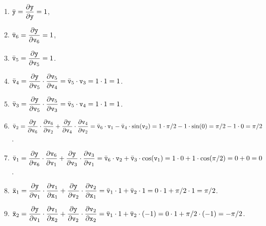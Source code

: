 \begin{enumerate}
\item $\displaystyle \bar{\mathtt{y}} = \frac{\partial \mathtt{y}}{\partial \mathtt{y}} = 1$,
\item $\displaystyle \bar{\mathtt{v}}_6 = \frac{\partial \mathtt{y}}{\partial \mathtt{v}_6} = 1$,
\item $\displaystyle \bar{\mathtt{v}}_5 = \frac{\partial \mathtt{y}}{\partial \mathtt{v}_5} = 1$.
\item $\displaystyle \bar{\mathtt{v}}_4 =
       \frac{\partial \mathtt{y}}{\partial \mathtt{v}_5} \cdot  \frac{\partial \mathtt{v}_5}{\partial \mathtt{v}_4}
       = \bar{\mathtt{v}}_5 \cdot \mathtt{v}_3 = 1 \cdot 1 = 1$.
\item $\displaystyle \bar{\mathtt{v}}_3 =
       \frac{\partial \mathtt{y}}{\partial \mathtt{v}_5} \cdot  \frac{\partial \mathtt{v}_5}{\partial \mathtt{v}_3}
       = \bar{\mathtt{v}}_5 \cdot \mathtt{v}_4 = 1 \cdot 1 = 1$.
\item $\displaystyle \bar{\mathtt{v}}_2 =
       \frac{\partial \mathtt{y}}{\partial \mathtt{v}_6} \cdot  \frac{\partial \mathtt{v}_6}{\partial \mathtt{v}_2} +
       \frac{\partial \mathtt{y}}{\partial \mathtt{v}_4} \cdot  \frac{\partial \mathtt{v}_4}{\partial \mathtt{v}_2} 
       = \bar{\mathtt{v}}_6 \cdot \mathtt{v}_1 - \bar{\mathtt{v}}_4 \cdot \sin(\mathtt{v}_2)
          = 1 \cdot \pi/2 - 1 \cdot \sin(0) = \pi/2 - 1 \cdot 0 = \pi/2$.
\item $\displaystyle \bar{\mathtt{v}}_1 =
       \frac{\partial \mathtt{y}}{\partial \mathtt{v}_6} \cdot  \frac{\partial \mathtt{v}_6}{\partial \mathtt{v}_1} +
       \frac{\partial \mathtt{y}}{\partial \mathtt{v}_3} \cdot  \frac{\partial \mathtt{v}_3}{\partial \mathtt{v}_1} 
       = \bar{\mathtt{v}}_6 \cdot \mathtt{v}_2 + \bar{\mathtt{v}}_3 \cdot \cos(\mathtt{v}_1)
          = 1 \cdot 0 + 1 \cdot \cos(\pi/2) = 0 + 0 = 0$.
\item $\displaystyle \bar{\mathtt{x}}_1 =
       \frac{\partial \mathtt{y}}{\partial \mathtt{v}_1} \cdot  \frac{\partial \mathtt{v}_1}{\partial \mathtt{x}_1} +
       \frac{\partial \mathtt{y}}{\partial \mathtt{v}_2} \cdot  \frac{\partial \mathtt{v}_2}{\partial \mathtt{x}_1} 
       = \bar{\mathtt{v}}_1 \cdot 1 + \bar{\mathtt{v}}_2 \cdot 1
          = 0 \cdot 1 + \pi/2 \cdot 1 = \pi/2$.
\item $\displaystyle \bar{\mathtt{x}}_2 =
       \frac{\partial \mathtt{y}}{\partial \mathtt{v}_1} \cdot  \frac{\partial \mathtt{v}_1}{\partial \mathtt{x}_2} +
       \frac{\partial \mathtt{y}}{\partial \mathtt{v}_2} \cdot  \frac{\partial \mathtt{v}_2}{\partial \mathtt{x}_2} 
       = \bar{\mathtt{v}}_1 \cdot 1 + \bar{\mathtt{v}}_2 \cdot (-1)
       = 0 \cdot 1 + \pi/2 \cdot (-1) = - \pi/2$.
\end{enumerate}
